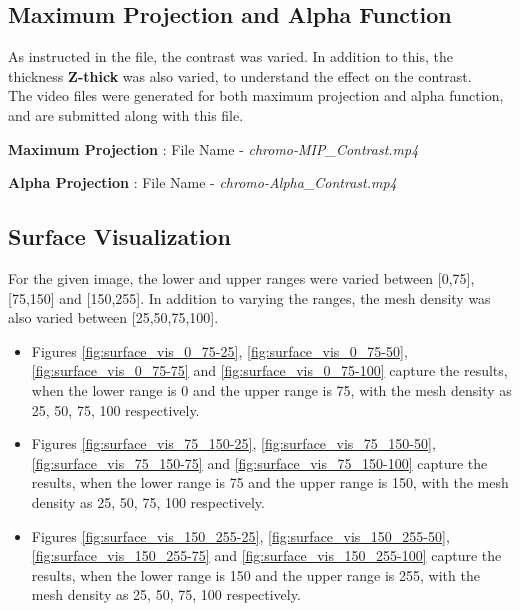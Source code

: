 \documentclass{article}
\begin{document}
\subsection*{Maximum Projection and Alpha Function}
As instructed in the file, the contrast was varied. In addition to this, the thickness \textbf{Z-thick} was also varied, to understand the effect on the contrast. \\The video files were generated for both maximum projection and alpha function, and are submitted along with this file. 

\medskip

\textbf{Maximum Projection} : File Name - \textit{chromo-MIP\_Contrast.mp4}

\textbf{Alpha Projection} : File Name - \textit{chromo-Alpha\_Contrast.mp4}
\subsection*{Surface Visualization}
For the given image, the lower and upper ranges were varied between [0,75], [75,150] and [150,255]. In addition to varying the ranges, the mesh density was also varied between [25,50,75,100].
\begin{itemize}
    \item Figures \ref{fig:surface_vis_0_75-25}, \ref{fig:surface_vis_0_75-50}, \ref{fig:surface_vis_0_75-75} and \ref{fig:surface_vis_0_75-100} capture the results, when the lower range is 0 and the upper range is 75, with the mesh density as 25, 50, 75, 100 respectively. 
    \item Figures \ref{fig:surface_vis_75_150-25}, \ref{fig:surface_vis_75_150-50}, \ref{fig:surface_vis_75_150-75} and \ref{fig:surface_vis_75_150-100} capture the results, when the lower range is 75 and the upper range is 150, with the mesh density as 25, 50, 75, 100 respectively.
    \item Figures \ref{fig:surface_vis_150_255-25}, \ref{fig:surface_vis_150_255-50}, \ref{fig:surface_vis_150_255-75} and \ref{fig:surface_vis_150_255-100} capture the results, when the lower range is 150 and the upper range is 255, with the mesh density as 25, 50, 75, 100 respectively. 
\end{itemize}
\end{document}
